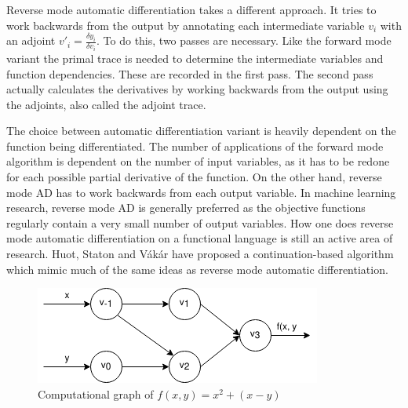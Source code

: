 \documentclass[11pt, final]{article}
\def\Vakar{V\'{a}k\'{a}r}
\begin{document}
Reverse mode automatic differentiation takes a different approach. It tries to work backwards from the output by annotating each intermediate variable $v_i$ with an adjoint $v'_i=\frac{\delta y_i}{\delta v_i}$. To do this, two passes are necessary. Like the forward mode variant the primal trace is needed to determine the intermediate variables and function dependencies. These are recorded in the first pass. The second pass actually calculates the derivatives by working backwards from the output using the adjoints, also called the adjoint trace.

The choice between automatic differentiation variant is heavily dependent on the function being differentiated. The number of applications of the forward mode algorithm is dependent on the number of input variables, as it has to be redone for each possible partial derivative of the function. On the other hand, reverse mode AD has to work backwards from each output variable. In machine learning research, reverse mode AD is generally preferred as the objective functions regularly contain a very small number of output variables. How one does reverse mode automatic differentiation on a functional language is still an active area of research. Huot, Staton and \Vakar{} have proposed a continuation-based algorithm which mimic much of the same ideas as reverse mode automatic differentiation\cite{huot2020correctness}.

\begin{figure}
  \centering
  \includegraphics[scale=0.6]{./assets/function_trace.png}
  \caption{Computational graph of $f(x, y) = x^2 + (x - y)$}
  \label{fig:func_trace}
\end{figure}
\end{document}
